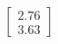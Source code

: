 \documentclass[preview]{standalone}
\begin{document}
\begin{align*}
\begin{bmatrix} 2.76 \\ 3.63 \end{bmatrix}
\end{align*}
\end{document}
